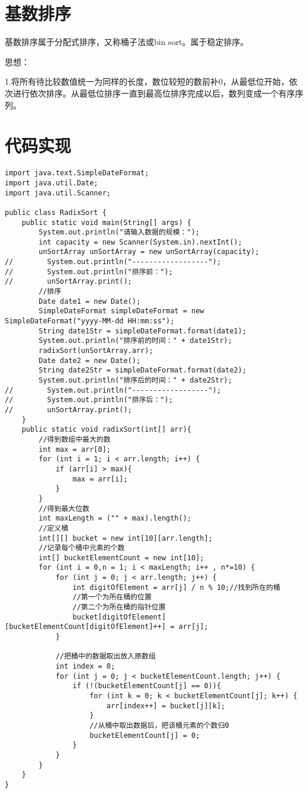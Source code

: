 \documentclass[a4paper]{report}
\begin{document}
\section{基数排序}
基数排序属于分配式排序，又称桶子法或bin sort。属于稳定排序。

思想：

1.将所有待比较数值统一为同样的长度，数位较短的数前补0，从最低位开始，依次进行依次排序。从最低位排序一直到最高位排序完成以后，数列变成一个有序序列。
\section{代码实现}
\begin{lstlisting}
import java.text.SimpleDateFormat;
import java.util.Date;
import java.util.Scanner;

public class RadixSort {
    public static void main(String[] args) {
        System.out.println("请输入数据的规模：");
        int capacity = new Scanner(System.in).nextInt();
        unSortArray unSortArray = new unSortArray(capacity);
//        System.out.println("------------------");
//        System.out.println("排序前：");
//        unSortArray.print();
        //排序
        Date date1 = new Date();
        SimpleDateFormat simpleDateFormat = new SimpleDateFormat("yyyy-MM-dd HH:mm:ss");
        String date1Str = simpleDateFormat.format(date1);
        System.out.println("排序前的时间：" + date1Str);
        radixSort(unSortArray.arr);
        Date date2 = new Date();
        String date2Str = simpleDateFormat.format(date2);
        System.out.println("排序后的时间：" + date2Str);
//        System.out.println("------------------");
//        System.out.println("排序后：");
//        unSortArray.print();
    }
    public static void radixSort(int[] arr){
        //得到数组中最大的数
        int max = arr[0];
        for (int i = 1; i < arr.length; i++) {
            if (arr[i] > max){
                max = arr[i];
            }
        }
        //得到最大位数
        int maxLength = ("" + max).length();
        //定义桶
        int[][] bucket = new int[10][arr.length];
        //记录每个桶中元素的个数
        int[] bucketElementCount = new int[10];
        for (int i = 0,n = 1; i < maxLength; i++ , n*=10) {
            for (int j = 0; j < arr.length; j++) {
                int digitOfElement = arr[j] / n % 10;//找到所在的桶
                //第一个为所在桶的位置
                //第二个为所在桶的指针位置
                bucket[digitOfElement][bucketElementCount[digitOfElement]++] = arr[j];
            }

            //把桶中的数据取出放入原数组
            int index = 0;
            for (int j = 0; j < bucketElementCount.length; j++) {
                if (!(bucketElementCount[j] == 0)){
                    for (int k = 0; k < bucketElementCount[j]; k++) {
                        arr[index++] = bucket[j][k];
                    }
                    //从桶中取出数据后，把该桶元素的个数归0
                    bucketElementCount[j] = 0;
                }
            }
        }
    }
}
\end{lstlisting}
\end{document}
